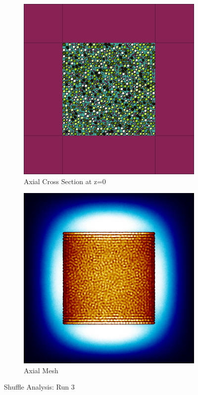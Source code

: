 \begin{figure}[H]
\begin{subfigure}{0.45\textwidth}
  \includegraphics[width=0.95\linewidth]{figures/3456012/3456012-v}
  \caption{Axial Cross Section at z=0 }
  \label{fig:3456012-v}
\end{subfigure}
%
\begin{subfigure}{0.45\textwidth}
  \includegraphics[width=0.95\linewidth]{figures/3456012/3456012-vm}
  \caption{Axial Mesh}
  \label{fig:3456012-vm}
\end{subfigure}
%
\caption{Shuffle Analysis: Run 3}
\label{fig:0-60}
\end{figure}
